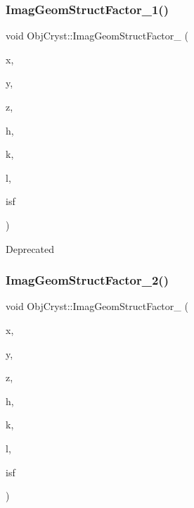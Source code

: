 \subsubsection{\texorpdfstring{ImagGeomStructFactor\_1()}{ImagGeomStructFactor\_1()}}
{\footnotesize\ttfamily void Obj\+Cryst\+::\+Imag\+Geom\+Struct\+Factor\+\_ (\begin{DoxyParamCaption}\item[{const R\+E\+AL}]{x,  }\item[{const R\+E\+AL}]{y,  }\item[{const R\+E\+AL}]{z,  }\item[{const Cryst\+Vector\+\_\+\+R\+E\+AL \&}]{h,  }\item[{const Cryst\+Vector\+\_\+\+R\+E\+AL \&}]{k,  }\item[{const Cryst\+Vector\+\_\+\+R\+E\+AL \&}]{l,  }\item[{Cryst\+Vector\+\_\+\+R\+E\+AL \&}]{isf }\end{DoxyParamCaption})}

\begin{DoxyRefDesc}{Deprecated}
\item[\mbox{\hyperlink{deprecated__deprecated000015}{Deprecated}}]\end{DoxyRefDesc}
\mbox{\label{namespace_obj_cryst_a4e32a246a42fea8ebfcc20236c8565a5}} 
\subsubsection{\texorpdfstring{ImagGeomStructFactor\_2()}{ImagGeomStructFactor\_2()}}
{\footnotesize\ttfamily void Obj\+Cryst\+::\+Imag\+Geom\+Struct\+Factor\+\_ (\begin{DoxyParamCaption}\item[{const R\+E\+AL}]{x,  }\item[{const R\+E\+AL}]{y,  }\item[{const R\+E\+AL}]{z,  }\item[{const Cryst\+Vector\+\_\+\+R\+E\+AL \&}]{h,  }\item[{const Cryst\+Vector\+\_\+\+R\+E\+AL \&}]{k,  }\item[{const Cryst\+Vector\+\_\+\+R\+E\+AL \&}]{l,  }\item[{Cryst\+Vector\+\_\+\+R\+E\+AL \&}]{isf }\end{DoxyParamCaption})}


